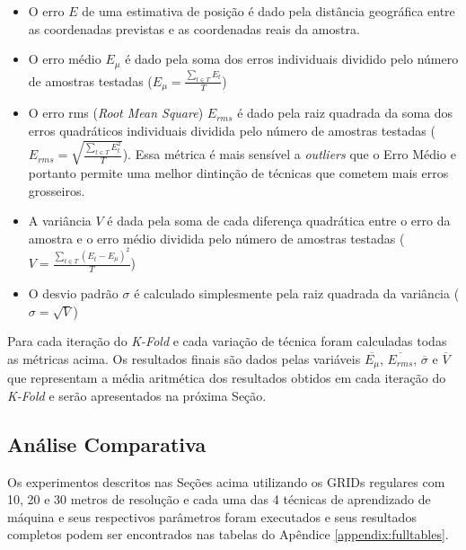\documentclass[12pt]{article}
\begin{document}
        \begin{itemize}
            \item{O erro $E$ de uma estimativa de posição é dado pela distância geográfica entre as coordenadas previstas e as coordenadas reais da amostra.
            }
            
            \item{O erro médio $E_{\mu}$ é dado pela soma dos erros individuais dividido pelo número de amostras testadas ($E_{\mu} = \frac{\sum_{t \in T}{E_t}}{T}$)
            }
            
            \item{O erro rms (\textit{Root Mean Square}) $E_{rms}$ é dado pela raiz quadrada da soma dos erros quadráticos individuais dividida pelo número de amostras testadas ($E_{rms} = \sqrt{\frac{\sum_{t \in T}{E_t^2}}{T}}$). Essa métrica é mais sensível a \textit{outliers} que o Erro Médio e portanto permite uma melhor dintinção de técnicas que cometem mais erros grosseiros.
            }
            
            \item{A variância $V$ é dada pela soma de cada diferença quadrática entre o erro da amostra e o erro médio dividida pelo número de amostras testadas ($V = \frac{\sum_{t \in T}{(E_t-E_{\mu})^2}}{T}$)
            }
            
            \item{O desvio padrão $\sigma$ é calculado simplesmente pela raiz quadrada da variância ($\sigma = \sqrt{V}$)
            }
        \end{itemize}
        
        Para cada iteração do \textit{K-Fold} e cada variação de técnica foram calculadas todas as métricas acima. Os resultados finais são dados pelas variáveis $\overline{E_{\mu}}$, $\overline{E_{rms}}$, $\overline{\sigma}$ e $\overline{V}$ que representam a média aritmética dos resultados obtidos em cada iteração do \textit{K-Fold} e serão apresentados na próxima Seção.

        \subsection{Análise Comparativa}
        \label{sec:resultados}
        
        Os experimentos descritos nas Seções acima utilizando os GRIDs regulares com 10, 20 e 30 metros de resolução e cada uma das 4 técnicas de aprendizado de máquina e seus respectivos parâmetros foram executados e seus resultados completos podem ser encontrados nas tabelas do Apêndice \ref{appendix:fulltables}.
        
\end{document}

